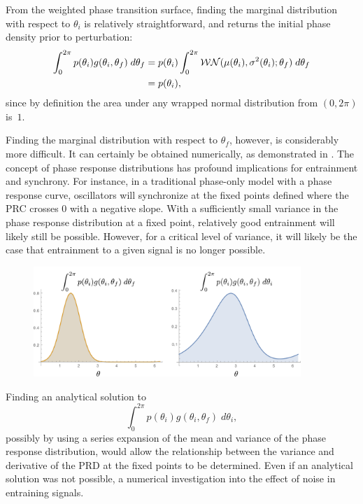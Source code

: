From the weighted phase transition surface, finding the marginal distribution with respect to $\theta_i$ is relatively straightforward, and returns the initial phase density prior to perturbation:
\begin{align*}
  \int_0^{2\pi} p(\theta_i) g(\theta_i, \theta_f) \; d\theta_f &= p(\theta_i) \int_0^{2\pi} {\cal WN}(\mu(\theta_i), \sigma^2(\theta_i); \theta_f) \; d\theta_f \\
  &= p(\theta_i),
\end{align*}
since by definition the area under any wrapped normal distribution from $(0, 2\pi)$ is~$1$.

Finding the marginal distribution with respect to $\theta_f$, however, is considerably more difficult.
It can certainly be obtained numerically, as demonstrated in .
The concept of phase response distributions has profound implications for entrainment and synchrony.
For instance, in a traditional phase-only model with a phase response curve, oscillators will synchronize at the fixed points defined where the PRC crosses 0 with a negative slope.
With a sufficiently small variance in the phase response distribution at a fixed point, relatively good entrainment will likely still be possible.
However, for a critical level of variance, it will likely be the case that entrainment to a given signal is no longer possible.

\begin{figure}[tbp]
  \centering
  \includegraphics[width=0.9\textwidth]{chap7/figures/phat.pdf}
  \label{fig:phat7}
\end{figure}

Finding an analytical solution to
\[
  \int_0^{2\pi} p(\theta_i) g(\theta_i, \theta_f) \; d\theta_i,
\]
possibly by using a series expansion of the mean and variance of the phase response distribution, would allow the relationship between the variance and derivative of the PRD at the fixed points to be determined.
Even if an analytical solution was not possible, a numerical investigation into the effect of noise in entraining signals.

